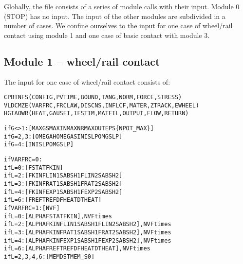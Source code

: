 \documentclass[12pt]{report}
\renewcommand{\magenta}[1]{}
\begin{document}
Globally, the file consists of a series of module calls with their input.
Module 0 (STOP) has no input. The input of the other modules are subdivided
in a number of cases. We confine ourselves to the input for one case of
wheel/rail contact using module 1 and one case of basic contact with module 3.

\subsection{Module 1 -- wheel/rail contact}

The input for one case of wheel/rail contact consists of:
\begin{alltt}\small
% Control integers, see section \ref{sec:controldigits}:

\magenta{ }CPBTNFS     (\magenta{        }CONFIG, PVTIME, BOUND , TANG  , NORM  , FORCE , STRESS)
\magenta{ }VLDCMZE     (\magenta{        }VARFRC, FRCLAW, DISCNS, INFLCF, MATER , ZTRACK, EWHEEL)
\magenta{X}HGIAOWR     (\magenta{XFLOW , }HEAT  , GAUSEI, IESTIM, MATFIL, OUTPUT, FLOW  , RETURN)

\magenta{% Parameters for additional debug output

if X=1:  [ PSFLRIN ] (PROFIL, SMOOTH, FORCE , LOCATE, READLN, INFLCF, NMDBG )

}% Parameters for the iterative solution algorithms (section \ref{sec:iter_const}):

if G<>1:      [ MAXGS   MAXIN   MAXNR   MAXOUT  EPS   \{NPOT\_MAX\}   ]
if G=2,3:     [ OMEGAH  OMEGAS  INISLP  OMGSLP        ]
if G=4:       [ INISLP  OMGSLP                        ]
\magenta{if G=5:       [ FDECAY  BETATH  KDOWFB  D\_IFC   D\_LIN   D\_CNS   D\_SLP   POW\_S ]
}
% Friction description (section \ref{sec:fric_dscrp}):
%      L=0 --> Coulomb friction with constant coefficient of friction
%      L=2 --> velocity dependent friction with linear/const formula
%      L=3 --> velocity dependent friction with rational formula
%      L=4 --> velocity dependent friction with exponential formula
%      L=6 --> temperature dependent friction with piecewise linear formula

if VARFRC=0:
      if L=0: [ FSTAT  FKIN                                ]
      if L=2: [ FKIN   FLIN1  SABSH1  FLIN2  SABSH2        ]
      if L=3: [ FKIN   FRAT1  SABSH1  FRAT2  SABSH2        ]
      if L=4: [ FKIN   FEXP1  SABSH1  FEXP2  SABSH2        ]
      if L=6: [ FREF   TREF   DFHEAT  DTHEAT               ]
if VARFRC=1:  [ NVF                                        ]
      if L=0: [ ALPHA  FSTAT  FKIN                         ], NVF times
      if L=2: [ ALPHA  FKIN   FLIN1  SABSH1  FLIN2  SABSH2 ], NVF times
      if L=3: [ ALPHA  FKIN   FRAT1  SABSH1  FRAT2  SABSH2 ], NVF times
      if L=4: [ ALPHA  FKIN   FEXP1  SABSH1  FEXP2  SABSH2 ], NVF times
      if L=6: [ ALPHA  FREF   TREF   DFHEAT  DTHEAT        ], NVF times
if L=2,3,4,6: [ MEMDST MEM\_S0                              ]


\end{alltt}
\end{document}

